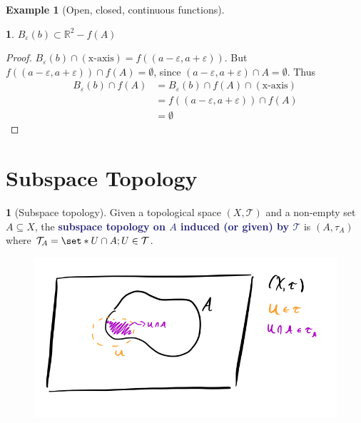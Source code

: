 \documentclass[11pt]{article}
\numberwithin{equation}{section}
\newcommand{\navy}[1]{\textcolor{MidnightBlue}{\bf #1}}
\theoremstyle{plain}
\newtheorem{claim}{\color{ForestGreen}{\textbf{Claim}}}[section]
\theoremstyle{definition}
\newtheorem{definition}{\color{MidnightBlue}{\textbf{Definition}}}[section]
\newtheorem{example}{\color{WildStrawberry}Example}[section]
\def\Set{\set*}%
\def\ss{\subset}
\def\sse{\subseteq}
\newcommand{\1}{\mathbbm 1}
\def\t{\tau}
\newcommand{\e}{\varepsilon}
\newcommand{\RR}{\mathbb R}
\newcommand{\tT}{\mathcal T}
\begin{document}
\begin{example}[Open, closed, continuous functions]
\begin{enumerate}
\begin{enumerate}
\begin{enumerate}
		 	 	\begin{claim}
		 	 		$B_\e(b) \ss \RR^2 - f(A)$
		 	 	\end{claim}
		 	 	\begin{proof}
		 	 		$B_\e(b) \cap (\text{x-axis}) = f((a-\e,a+\e))$. But $f((a-\e,a+\e)) \cap f(A) = \emptyset$, since $(a-\e,a+\e) \cap A = \emptyset$. Thus
		 	 		\begin{align*}
		 	 			B_\e(b) \cap f(A) &= B_\e(b) \cap f(A) \cap (\text{x-axis}) \\
		 	 			&= f((a-\e,a+\e)) \cap f(A) \\
		 	 			&= \emptyset
		 	 		\end{align*}
		 	 		
		 	 	\end{proof}
		 	 	
		 	 \end{enumerate} 
		 \end{enumerate}
	\end{enumerate}
\end{example}

\section{Subspace Topology}

\begin{definition}[Subspace topology]
	Given a topological space $(X,\tT)$ and a non-empty set $A \sse X$, the \navy{subspace topology on $A$ induced (or given) by $\tT$} is $(A, \t_A)$ where $\tT_A = \Set{U \cap A; U \in \tT}$. 
\end{definition}

\begin{figure}[H]
	\begin{center}
		\includegraphics[scale=.4]{subspace_topology.png}
	\end{center}
\end{figure}
\end{document}
